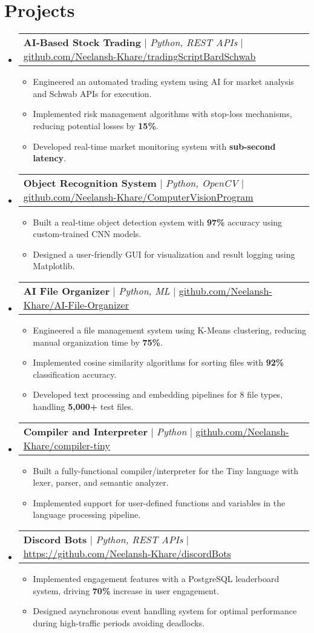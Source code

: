 \documentclass[letterpaper,11pt]{article}
\makeatletter
\newcommand{\resumeItem}[1]{
  \item\small{
    {#1 \vspace{-1pt}}
  }
}
\newcommand{\resumeProjectHeading}[2]{
    \item
    \begin{tabular*}{0.97\textwidth}{l@{\extracolsep{\fill}}r}
      \small#1 & #2 \\
    \end{tabular*}\vspace{-5pt}
}
\newcommand{\resumeSubHeadingListStart}{\begin{itemize}[leftmargin=0.15in, label={}]}
\newcommand{\resumeSubHeadingListEnd}{\end{itemize}}
\newcommand{\resumeItemListStart}{\begin{itemize}}
\newcommand{\resumeItemListEnd}{\end{itemize}\vspace{-5pt}}
\makeatother
\begin{document}
\section{Projects}
\resumeSubHeadingListStart
\resumeProjectHeading
    {\textbf{AI-Based Stock Trading} $|$ \emph{Python, REST APIs} $|$ \href{https://github.com/Neelansh-Khare/tradingScriptBardSchwab}{{github.com/Neelansh-Khare/tradingScriptBardSchwab}}}{}
      \resumeItemListStart
        \resumeItem{Engineered an automated trading system using AI for market analysis and Schwab APIs for execution.}
        \resumeItem{Implemented risk management algorithms with stop-loss mechanisms, reducing potential losses by \textbf{15\%}.}
        \resumeItem{Developed real-time market monitoring system with \textbf{sub-second latency}.}
      \resumeItemListEnd
\resumeProjectHeading
    {\textbf{Object Recognition System} $|$ \emph{Python, OpenCV} $|$ \href{https://github.com/Neelansh-Khare/ComputerVisionProgram}{{github.com/Neelansh-Khare/ComputerVisionProgram}}}{}
      \resumeItemListStart
        \resumeItem{Built a real-time object detection system with \textbf{97\%} accuracy using custom-trained CNN models.}
        \resumeItem{Designed a user-friendly GUI for visualization and result logging using Matplotlib.}
      \resumeItemListEnd
\resumeProjectHeading
    {\textbf{AI File Organizer} $|$ \emph{Python, ML} $|$ \href{https://github.com/Neelansh-Khare/AI-File-Organizer}{{github.com/Neelansh-Khare/AI-File-Organizer}}}{}
      \resumeItemListStart
        \resumeItem{Engineered a file management system using K-Means clustering, reducing manual organization time by \textbf{75\%}.}
        \resumeItem{Implemented cosine similarity algorithms for sorting files with \textbf{92\%} classification accuracy.}
        \resumeItem{Developed text processing and embedding pipelines for 8 file types, handling \textbf{5,000+} test files.}
      \resumeItemListEnd
\resumeProjectHeading
    {\textbf{Compiler and Interpreter} $|$ \emph{Python} $|$ \href{https://github.com/Neelansh-Khare/compiler-tiny}{{github.com/Neelansh-Khare/compiler-tiny}}}{}
      \resumeItemListStart
        \resumeItem{Built a fully-functional compiler/interpreter for the Tiny language with lexer, parser, and semantic analyzer.}
        \resumeItem{Implemented support for user-defined functions and variables in the language processing pipeline.}
      \resumeItemListEnd
\resumeProjectHeading
      {\textbf{Discord Bots} $|$ \emph{Python, REST APIs} $|$ \href{https://github.com/Neelansh-Khare/discordBots}{{https://github.com/Neelansh-Khare/discordBots}}}{}
        \resumeItemListStart
          \resumeItem{Implemented engagement features with a PostgreSQL leaderboard system, driving \textbf{70\%} increase in user
          engagement.}
          \resumeItem{Designed asynchronous event handling system for optimal performance during high-traffic periods avoiding deadlocks.}
        \resumeItemListEnd
\resumeSubHeadingListEnd
\end{document}
